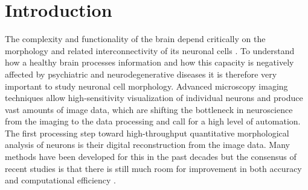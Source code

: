 \section{Introduction}
\label{sec:introduction}
The complexity and functionality of the brain depend critically on the morphology and related interconnectivity of its neuronal cells \cite{kandel2000principles, ascoli2002computational, donohue2008comparative}. To understand how a healthy brain processes information and how this capacity is negatively affected by psychiatric and neurodegenerative diseases \cite{anderton1998dendritic, lin2010mechanisms, vsivskova2014dendritic} it is therefore very important to study neuronal cell morphology. Advanced microscopy imaging techniques allow high-sensitivity visualization of individual neurons and produce vast amounts of image data, which are shifting the bottleneck in neuroscience from the imaging to the data processing \cite{svoboda2011past, peng2011proof, senft2011brief, halavi2012digital} and call for a high level of automation. The first processing step toward high-throughput quantitative morphological analysis of neurons is their digital reconstruction from the image data. Many methods have been developed for this in the past decades \cite{meijering2010neuron, donohue2011automated} but the consensus of recent studies is that there is still much room for improvement in both accuracy and computational efficiency \cite{liu2011diadem, svoboda2011past}.

